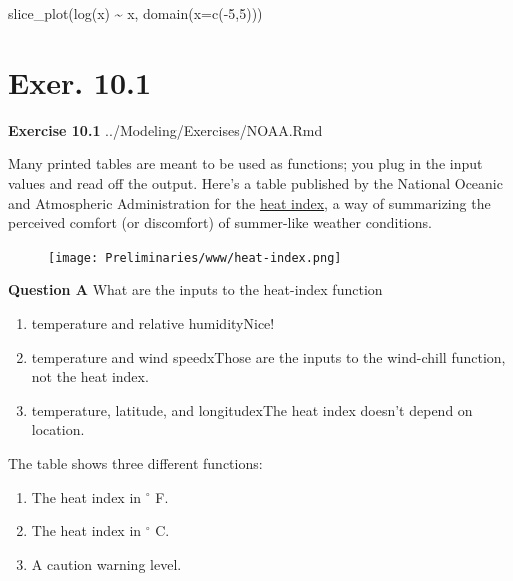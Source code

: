 \documentclass[
  letterpaper,
  DIV=11,
  numbers=noendperiod,
  oneside]{article}
\newenvironment{Shaded}{\begin{snugshade}}{\end{snugshade}}
\newcommand{\AttributeTok}[1]{\textcolor[rgb]{0.40,0.45,0.13}{#1}}
\newcommand{\DecValTok}[1]{\textcolor[rgb]{0.68,0.00,0.00}{#1}}
\newcommand{\FunctionTok}[1]{\textcolor[rgb]{0.28,0.35,0.67}{#1}}
\newcommand{\NormalTok}[1]{\textcolor[rgb]{0.00,0.23,0.31}{#1}}
\newcommand{\SpecialCharTok}[1]{\textcolor[rgb]{0.37,0.37,0.37}{#1}}
\providecommand{\tightlist}{%
  \setlength{\itemsep}{0pt}\setlength{\parskip}{0pt}}\usepackage{longtable,booktabs,array}
\begin{document}
\begin{multicols}{2}
\begin{Shaded}
\begin{Highlighting}[]
\FunctionTok{slice\_plot}\NormalTok{(}\FunctionTok{log}\NormalTok{(x) }\SpecialCharTok{\textasciitilde{}}\NormalTok{ x, }\FunctionTok{domain}\NormalTok{(}\AttributeTok{x=}\FunctionTok{c}\NormalTok{(}\SpecialCharTok{{-}}\DecValTok{5}\NormalTok{,}\DecValTok{5}\NormalTok{)))}
\end{Highlighting}
\end{Shaded}

\hypertarget{exer.-10.1}{%
\section*{Exer. 10.1}\label{exer.-10.1}}

\textbf{Exercise 10.1} ../Modeling/Exercises/NOAA.Rmd

Many printed tables are meant to be used as functions; you plug in the
input values and read off the output. Here's a table published by the
National Oceanic and Atmospheric Administration for the
\href{https://en.wikipedia.org/wiki/Heat_index}{heat index}, a way of
summarizing the perceived comfort (or discomfort) of summer-like weather
conditions.

\begin{figure}

{\centering \texttt{[image: Preliminaries/www/heat-index.png]}

}

\end{figure}

\textbf{Question A} What are the inputs to the heat-index function

\begin{enumerate}
\def\labelenumi{\roman{enumi}.}
\tightlist
\item
  {temperature and relative humidity{Nice!~}}\\
\item
  {temperature and wind speed{xThose are the inputs to the wind-chill
  function, not the heat index.}}\\
\item
  {temperature, latitude, and longitude{xThe heat index doesn't depend
  on location.}}
\end{enumerate}

The table shows three different functions:

\begin{enumerate}
\def\labelenumi{\arabic{enumi}.}
\tightlist
\item
  The heat index in \(^\circ\) F.
\item
  The heat index in \(^\circ\) C.
\item
  A caution warning level.
\end{enumerate}


\end{multicols}
\end{document}
